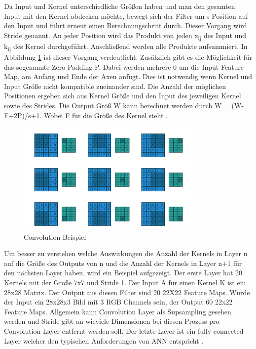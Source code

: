 \documentclass{llncs}
\begin{document}
Da Input und Kernel unterschiedliche Größen haben und man den gesamten Input mit den Kernel abdecken möchte, bewegt sich der Filter um s Position auf den Input und führt erneut einen Berechnungschritt durch. Dieser Vorgang wird Stride genannt. An jeder Position wird das Produkt von jeden x\textsubscript{ij} des Input und k\textsubscript{ij} des Kernel durchgeführt.  Anschließend werden alle Produkte aufsummiert. In Abbildung \ref{fig:Bild3} ist dieser Vorgang verdeutlicht. Zusätzlich gibt es die Möglichkeit für das sogenannte Zero Padding P. Dabei werden mehrere 0 um die Input Feature Map, am Anfang und Ende der Axen anfügt. Dies ist notwendig wenn Kernel und Input Größe nicht kompatible zueinander sind. Die Anzahl der möglichen Positionen ergeben sich aus Kernel Größe und den Input des jeweiligen Kernel sowie des Strides. Die Output Größ W kann berechnet werden durch W = (W-F+2P)/s+1. Wobei F für die Größe des Kernel steht \cite{conv}.

\begin{figure}
	\centering
	\includegraphics[width=0.8\textwidth]{conv.png}
	\caption{Convolution Beispiel}
	\label{fig:Bild3}
\end{figure}

Um  besser zu verstehen welche Auswirkungen die Anzahl der Kernels in Layer n auf die Größe des Outputs von n und die Anzahl der Kernels in Layer n+1 für den nächsten Layer haben, wird ein Beispiel aufgezeigt. Der erste Layer hat 20 Kernels mit der Größe 7x7 und Stride 1. Der Input A für einen Kernel K ist ein 28x28 Matrix. Der Output aus diesen Filter sind 20 22X22 Feature Maps. Würde der Input ein 28x28x3 Bild mit 3 RGB Channels sein, der Output 60 22x22 Feature Maps. Allgemein kann Convolution Layer als Supsampling gesehen werden und Stride gibt an wieviele Dimensionen bei diesen Prozess pro Convolution Layer entfernt werden soll. Der letzte Layer ist ein fully-connected Layer welcher den typischen Anforderungen von ANN entspricht \cite{conv}.  
\\
\end{document}
